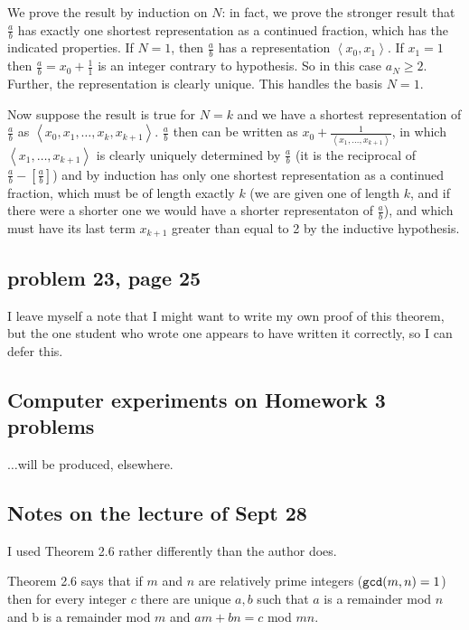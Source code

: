\documentclass[12pt]{article}
\begin{document}
We prove the result by induction on $N$:  in fact, we prove the stronger result that $\frac ab$ has exactly one shortest representation as a continued fraction, which has the indicated properties.   If $N=1$, then $\frac ab$ has a representation $\left<x_0,x_1\right>$.  If $x_1 = 1$ then $\frac ab = x_0 + \frac 1 1$ is an integer contrary to hypothesis.  So in this case $a_N \geq 2$.  Further, the representation is clearly unique.  This handles the basis $N=1$.

Now suppose the result is true for $N=k$ and we have a shortest representation of $\frac ab$ as $\left<x_0,x_1,\ldots,x_k,x_{k+1}\right>$.  $\frac ab$ then can be written
as $x_0 + \frac 1{\left<x_1,\ldots,x_{k+1}\right>}$, in which $\left<x_1,\ldots,x_{k+1}\right>$ is clearly uniquely determined by $\frac ab$ (it is the reciprocal of $\frac ab - [\frac ab]$)
and by induction has only one shortest representation as a continued fraction, which must be of length exactly $k$ (we are given one of length $k$, and if there were a shorter one we would have a shorter representaton of $\frac ab$), and which must have its last term $x_{k+1}$ greater than equal to 2 by the inductive hypothesis.

\subsection{problem 23, page 25}

I leave myself a note that I might want to write my own proof of this theorem, but the one student who wrote one appears to have written it correctly, so I can defer this.

\subsection{Computer experiments on Homework 3 problems}

$\ldots$will be produced, elsewhere.

\subsection{Notes on the lecture of Sept 28}

I used Theorem 2.6 rather differently than the author does.

Theorem 2.6 says that if $m$ and $n$ are relatively prime integers (${\tt gcd}(m,n)=1$) then for every integer $c$ there are unique $a,b$ such that $a$ is a remainder mod $n$ and b is a remainder mod $m$ and $am + bn = c$ mod $mn$.
\end{document}
